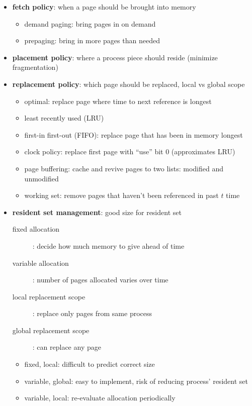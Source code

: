 \documentclass[]{article}
\theoremstyle{definition}
\begin{document}
	\begin{itemize}
		\item \textbf{fetch policy}: when a page should be brought into memory
			\begin{itemize}
				\item demand paging: bring pages in on demand
				\item prepaging: bring in more pages than needed
			\end{itemize}
		\item \textbf{placement policy}: where a process piece should reside (minimize fragmentation)
		\item \textbf{replacement policy}: which page should be replaced, local vs global scope
			\begin{itemize}
				\item optimal: replace page where time to next reference is longest
				\item least recently used (LRU)
				\item first-in first-out (FIFO): replace page that has been in memory longest
				\item clock policy: replace first page with ``use'' bit 0 (approximates LRU)
				\item page buffering: cache and revive pages to two lists: modified and unmodified
				\item working set: remove pages that haven't been referenced in past $t$ time
			\end{itemize}
		\item \textbf{resident set management}: good size for resident set
			\begin{description}
				\item[fixed allocation]: decide how much memory to give ahead of time
				\item[variable allocation]: number of pages allocated varies over time
				\item[local replacement scope]: replace only pages from same process
				\item[global replacement scope]: can replace any page
			\end{description}
			\begin{itemize}
				\item fixed, local: difficult to predict correct size
				\item variable, global: easy to implement, risk of reducing process' resident set
				\item variable, local: re-evaluate allocation periodically
			\end{itemize}

\end{itemize}
\end{document}
